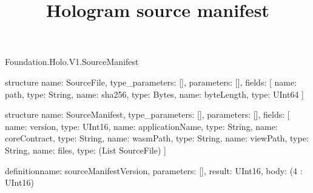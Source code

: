 \begin{lexlean}{Foundation.Holo.V1.SourceManifest}
\title{Hologram source manifest}
\begin{semanticmodule}
structure{
  name: SourceFile,
  type_parameters: [],
  parameters: [],
  fields: [
    {name: path, type: String},
    {name: sha256, type: Bytes},
    {name: byteLength, type: UInt64}
  ]
}

structure{
  name: SourceManifest,
  type_parameters: [],
  parameters: [],
  fields: [
    {name: version, type: UInt16},
    {name: applicationName, type: String},
    {name: coreContract, type: String},
    {name: wasmPath, type: String},
    {name: viewPath, type: String},
    {name: files, type: (List SourceFile)}
  ]
}

definition{name: sourceManifestVersion, parameters: [], result: UInt16, body: (4 : UInt16)}
\end{semanticmodule}
\end{lexlean}
